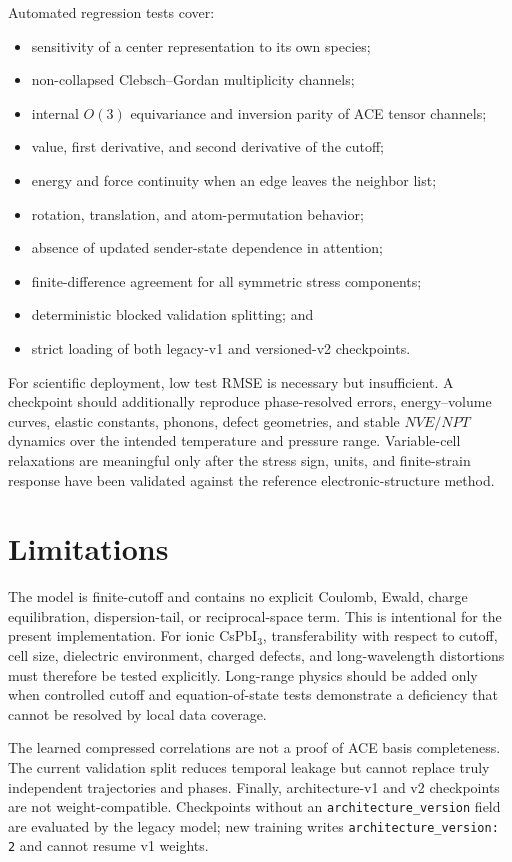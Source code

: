 \documentclass[10pt]{article}
\begin{document}
Automated regression tests cover:
\begin{itemize}
  \item sensitivity of a center representation to its own species;
  \item non-collapsed Clebsch--Gordan multiplicity channels;
  \item internal $O(3)$ equivariance and inversion parity of ACE tensor channels;
  \item value, first derivative, and second derivative of the cutoff;
  \item energy and force continuity when an edge leaves the neighbor list;
  \item rotation, translation, and atom-permutation behavior;
  \item absence of updated sender-state dependence in attention;
  \item finite-difference agreement for all symmetric stress components;
  \item deterministic blocked validation splitting; and
  \item strict loading of both legacy-v1 and versioned-v2 checkpoints.
\end{itemize}

For scientific deployment, low test RMSE is necessary but insufficient. A
checkpoint should additionally reproduce phase-resolved errors, energy--volume
curves, elastic constants, phonons, defect geometries, and stable $NVE/NPT$
dynamics over the intended temperature and pressure range. Variable-cell
relaxations are meaningful only after the stress sign, units, and finite-strain
response have been validated against the reference electronic-structure method.

\section{Limitations}

The model is finite-cutoff and contains no explicit Coulomb, Ewald, charge
equilibration, dispersion-tail, or reciprocal-space term. This is intentional
for the present implementation. For ionic CsPbI$_3$, transferability with
respect to cutoff, cell size, dielectric environment, charged defects, and
long-wavelength distortions must therefore be tested explicitly. Long-range
physics should be added only when controlled cutoff and equation-of-state tests
demonstrate a deficiency that cannot be resolved by local data coverage.

The learned compressed correlations are not a proof of ACE basis completeness.
The current validation split reduces temporal leakage but cannot replace truly
independent trajectories and phases. Finally, architecture-v1 and v2 checkpoints
are not weight-compatible. Checkpoints without an
\texttt{architecture\_version} field are evaluated by the legacy model; new
training writes \texttt{architecture\_version: 2} and cannot resume v1 weights.
\end{document}
